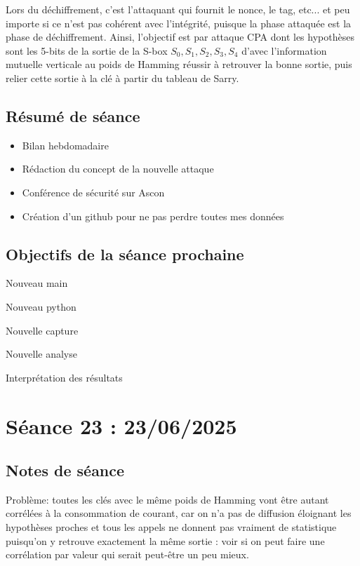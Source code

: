 \documentclass[12pt]{article}
\newcommand{\cmark}{\ding{51}}%
\newcommand{\done}{\rlap{$\square$}{\raisebox{2pt}{\large\hspace{1pt}\cmark}}%
	\hspace{-2.5pt}}
\begin{document}
	\noindent Lors du déchiffrement, c'est l'attaquant qui fournit le nonce, le tag, etc... et peu importe si ce n'est pas cohérent avec l'intégrité, puisque la phase attaquée est la phase de déchiffrement. Ainsi, l'objectif est par attaque CPA dont les hypothèses sont les 5-bits de la sortie de la S-box $S_0,S_1,S_2,S_3,S_4$ d'avec l'information mutuelle verticale au poids de Hamming réussir à retrouver la bonne sortie, puis relier cette sortie à la clé à partir du tableau de Sarry.
	
	
	\subsection{Résumé de séance}
	\begin{itemize}
		\item Bilan hebdomadaire
		\item Rédaction du concept de la nouvelle attaque
		\item Conférence de sécurité sur Ascon
		\item Création d'un github pour ne pas perdre toutes mes données
	\end{itemize}
	
	\subsection{Objectifs de la séance prochaine}
	\begin{todolist}
		\item[\done] Nouveau main
		\item[\done] Nouveau python
		\item[\done] Nouvelle capture
		\item[\done] Nouvelle analyse
		\item[\done] Interprétation des résultats
	\end{todolist}
	
	\section{Séance 23 : 23/06/2025}
	\subsection{Notes de séance}
	Problème: toutes les clés avec le même poids de Hamming vont être autant corrélées à la consommation de courant, car on n'a pas de diffusion éloignant les hypothèses proches et tous les appels ne donnent pas vraiment de statistique puisqu'on y retrouve exactement la même sortie : voir si on peut faire une corrélation par valeur qui serait peut-être un peu mieux.
	
\end{document}
